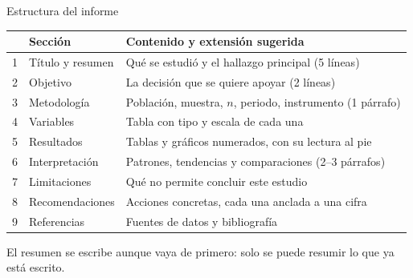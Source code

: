 \documentclass[aspectratio=169,10pt]{beamer}
\begin{document}
\begin{frame}{Estructura del informe}
  \scriptsize
  \begin{center}
  \begin{tabular}{@{}rp{3.1cm}p{7.0cm}@{}}
    \toprule
    & \textbf{Sección} & \textbf{Contenido y extensión sugerida} \\
    \midrule
    1 & Título y resumen & Qué se estudió y el hallazgo principal (5 líneas) \\
    2 & Objetivo & La decisión que se quiere apoyar (2 líneas) \\
    3 & Metodología & Población, muestra, $n$, periodo, instrumento (1 párrafo) \\
    4 & Variables & Tabla con tipo y escala de cada una \\
    5 & Resultados & Tablas y gráficos numerados, con su lectura al pie \\
    6 & Interpretación & Patrones, tendencias y comparaciones (2--3 párrafos) \\
    7 & Limitaciones & Qué no permite concluir este estudio \\
    8 & Recomendaciones & Acciones concretas, cada una anclada a una cifra \\
    9 & Referencias & Fuentes de datos y bibliografía \\
    \bottomrule
  \end{tabular}
  \end{center}

  \vspace{0.05cm}
  {\tiny\color{uniGris} El resumen se escribe  aunque vaya de
  primero: solo se puede resumir lo que ya está escrito.}
\end{frame}
\end{document}
